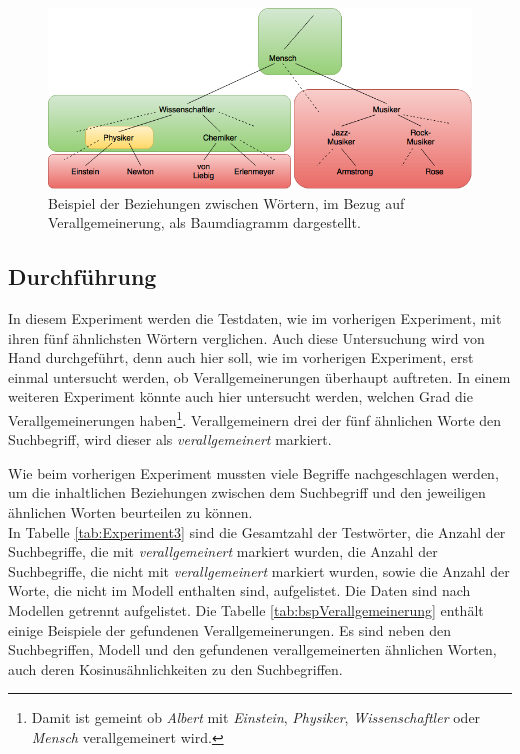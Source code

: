 \documentclass[12pt,a4paper]{report}
\begin{document}
\begin{figure}[h]
  \begin{center}
	\includegraphics[scale=0.55]{Verallgemeinerung_Baum2.png}
  \end{center}  
  \caption{Beispiel der Beziehungen zwischen Wörtern, im Bezug auf Verallgemeinerung, als Baumdiagramm dargestellt.}
  \label{pic:Verallgemeinerung}
\end{figure}
		
		\subsection*{Durchführung}
		In diesem Experiment werden die Testdaten, wie im vorherigen Experiment, mit ihren fünf ähnlichsten Wörtern verglichen. Auch diese Untersuchung wird von Hand durchgeführt, denn auch hier soll, wie im vorherigen Experiment, erst einmal untersucht werden, ob Verallgemeinerungen überhaupt auftreten. In einem weiteren Experiment könnte auch hier untersucht werden, welchen Grad die Verallgemeinerungen haben\footnote{Damit ist gemeint ob \textit{Albert} mit \textit{Einstein}, \textit{Physiker}, \textit{Wissenschaftler} oder \textit{Mensch} verallgemeinert wird.}. Verallgemeinern drei der fünf ähnlichen Worte den Suchbegriff, wird dieser als \textit{verallgemeinert} markiert. 
		
		
		Wie beim vorherigen Experiment mussten viele Begriffe nachgeschlagen werden,  um die inhaltlichen Beziehungen zwischen dem Suchbegriff und den jeweiligen ähnlichen Worten beurteilen zu können.\\
		
In Tabelle \ref{tab:Experiment3} sind die Gesamtzahl der Testwörter, die Anzahl der Suchbegriffe, die mit \textit{verallgemeinert} markiert wurden, die Anzahl der Suchbegriffe,  die nicht mit \textit{verallgemeinert} markiert wurden, sowie die Anzahl der Worte, die nicht im Modell enthalten sind, aufgelistet. Die Daten sind nach Modellen getrennt aufgelistet. Die Tabelle \ref{tab:bspVerallgemeinerung} enthält einige Beispiele der gefundenen Verallgemeinerungen. Es sind neben den Suchbegriffen, Modell und den gefundenen verallgemeinerten ähnlichen Worten, auch deren Kosinusähnlichkeiten zu den Suchbegriffen.
		
\end{document}
